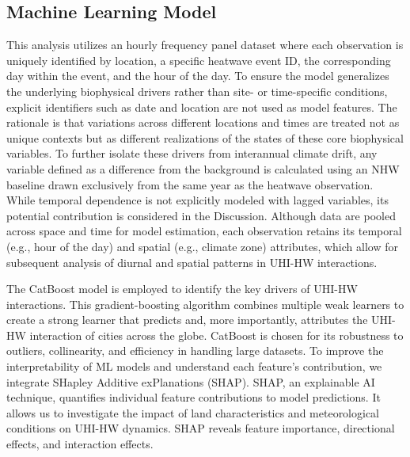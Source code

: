 \subsection*{Machine Learning Model}This analysis utilizes an hourly frequency panel dataset where each observation is uniquely identified by location, a specific heatwave event ID, the corresponding day within the event, and the hour of the day. To ensure the model generalizes the underlying biophysical drivers rather than site- or time-specific conditions, explicit identifiers such as date and location are not used as model features. The rationale is that variations across different locations and times are treated not as unique contexts but as different realizations of the states of these core biophysical variables. To further isolate these drivers from interannual climate drift, any variable defined as a difference from the background is calculated using an NHW baseline drawn exclusively from the same year as the heatwave observation. While temporal dependence is not explicitly modeled with lagged variables, its potential contribution is considered in the Discussion. Although data are pooled across space and time for model estimation, each observation retains its temporal (e.g., hour of the day) and spatial (e.g., climate zone) attributes, which allow for subsequent analysis of diurnal and spatial patterns in UHI-HW interactions.

The CatBoost model is employed to identify the key drivers of UHI-HW interactions. This gradient-boosting algorithm combines multiple weak learners to create a strong learner that predicts and, more importantly, attributes the UHI-HW interaction of cities across the globe. CatBoost is chosen for its robustness to outliers, collinearity, and efficiency in handling large datasets. To improve the interpretability of ML models and understand each feature's contribution, we integrate SHapley Additive exPlanations (SHAP). SHAP, an explainable AI technique, quantifies individual feature contributions to model predictions. It allows us to investigate the impact of land characteristics and meteorological conditions on UHI-HW dynamics. SHAP reveals feature importance, directional effects, and interaction effects.

